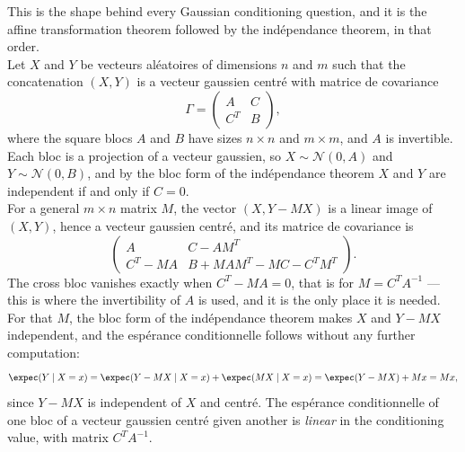\begin{example}
This is the shape behind every Gaussian conditioning question, and it is the
affine transformation theorem followed by the indépendance theorem, in that
order.\\

Let $X$ and $Y$ be vecteurs aléatoires of dimensions $n$ and $m$ such that the
concatenation $(X,Y)$ is a vecteur gaussien centré with matrice de covariance
\[
  \Gamma = \begin{pmatrix} A & C \\ C^{T} & B \end{pmatrix} ,
\]
where the square blocs $A$ and $B$ have sizes $n \times n$ and $m \times m$, and
$A$ is invertible. Each bloc is a projection of a vecteur gaussien, so
$X \sim \mathcal{N}(0,A)$ and $Y \sim \mathcal{N}(0,B)$, and by the bloc form of
the indépendance theorem $X$ and $Y$ are independent if and only if $C = 0$.\\

For a general $m \times n$ matrix $M$, the vector $(X, Y - MX)$ is a linear image
of $(X,Y)$, hence a vecteur gaussien centré, and its matrice de covariance is
\[
  \begin{pmatrix}
    A & C - AM^{T} \\
    C^{T} - MA & B + MAM^{T} - MC - C^{T}M^{T}
  \end{pmatrix} .
\]
The cross bloc vanishes exactly when $C^{T} - MA = 0$, that is for
$M = C^{T}A^{-1}$ --- this is where the invertibility of $A$ is used, and it is
the only place it is needed. For that $M$, the bloc form of the indépendance
theorem makes $X$ and $Y - MX$ independent, and the espérance conditionnelle
follows without any further computation:
\[
  \expec(Y \mid X = x) = \expec(Y - MX \mid X = x) + \expec(MX \mid X = x)
                       = \expec(Y - MX) + Mx = Mx ,
\]
since $Y - MX$ is independent of $X$ and centré. The espérance conditionnelle of
one bloc of a vecteur gaussien centré given another is \emph{linear} in the
conditioning value, with matrix $C^{T}A^{-1}$.\\


\end{example}
